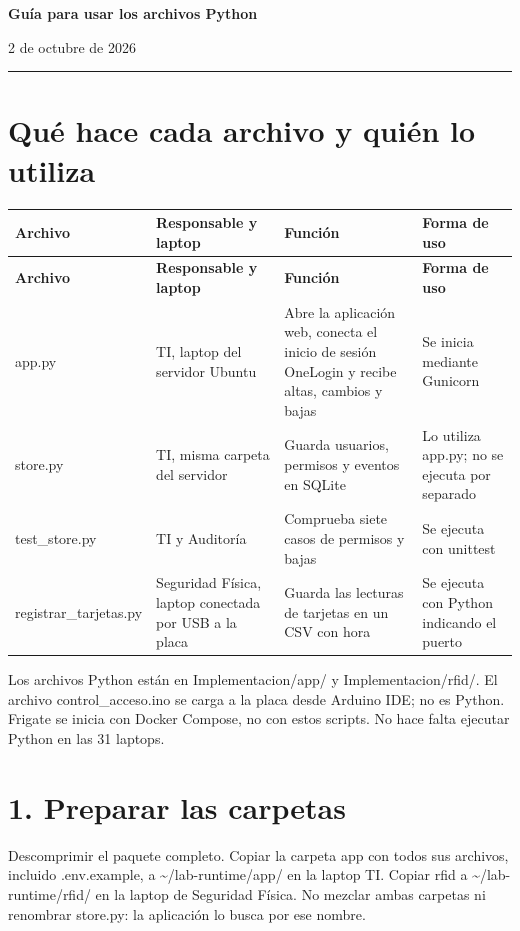 \documentclass[12pt,a4paper]{article}
\begin{document}
{\LARGE\bfseries Guía para usar los archivos Python\par}\vspace{6pt}
2 de octubre de 2026\par\hrule\vspace{10pt}
\section*{Qué hace cada archivo y quién lo utiliza}
{\small\renewcommand{\arraystretch}{1.2}
\begin{longtable}{p{3.660cm}p{3.660cm}p{3.660cm}p{3.660cm}}
\toprule
\textbf{Archivo} & \textbf{Responsable y laptop} & \textbf{Función} & \textbf{Forma de uso} \\ \midrule\endfirsthead
\textbf{Archivo} & \textbf{Responsable y laptop} & \textbf{Función} & \textbf{Forma de uso} \\ \midrule\endhead
\textnormal{app.py} & TI, laptop del servidor Ubuntu & Abre la aplicación web, conecta el inicio de sesión OneLogin y recibe altas, cambios y bajas & Se inicia mediante Gunicorn \\
\textnormal{store.py} & TI, misma carpeta del servidor & Guarda usuarios, permisos y eventos en SQLite & Lo utiliza \textnormal{app.py}; no se ejecuta por separado \\
\textnormal{test\_\allowbreak{}store.py} & TI y Auditoría & Comprueba siete casos de permisos y bajas & Se ejecuta con unittest \\
\textnormal{registrar\_\allowbreak{}tarjetas.py} & Seguridad Física, laptop conectada por USB a la placa & Guarda las lecturas de tarjetas en un CSV con hora & Se ejecuta con Python indicando el puerto \\
\bottomrule\end{longtable}}
Los archivos Python están en \textnormal{Implementacion/\allowbreak{}app/\allowbreak{}} y \textnormal{Implementacion/\allowbreak{}rfid/\allowbreak{}}. El archivo \textnormal{control\_\allowbreak{}acceso.ino} se carga a la placa desde Arduino IDE; no es Python. Frigate se inicia con Docker Compose, no con estos scripts. No hace falta ejecutar Python en las 31 laptops.\par
{}\section*{1. Preparar las carpetas}
Descomprimir el paquete completo. Copiar la carpeta \textnormal{app} con todos sus archivos, incluido \textnormal{.env.example}, a \textnormal{\textasciitilde{}/\allowbreak{}lab-runtime/\allowbreak{}app/\allowbreak{}} en la laptop TI. Copiar \textnormal{rfid} a \textnormal{\textasciitilde{}/\allowbreak{}lab-runtime/\allowbreak{}rfid/\allowbreak{}} en la laptop de Seguridad Física. No mezclar ambas carpetas ni renombrar \textnormal{store.py}: la aplicación lo busca por ese nombre.\par
\end{document}
